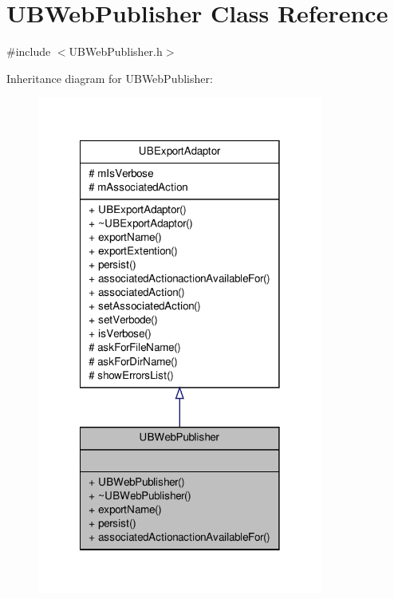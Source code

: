 \hypertarget{class_u_b_web_publisher}{\section{U\-B\-Web\-Publisher Class Reference}
\label{de/d5f/class_u_b_web_publisher}
}


{\ttfamily \#include $<$U\-B\-Web\-Publisher.\-h$>$}



Inheritance diagram for U\-B\-Web\-Publisher\-:
\nopagebreak
\begin{figure}[H]
\begin{center}
\leavevmode
\includegraphics[width=266pt]{db/d49/class_u_b_web_publisher__inherit__graph}
\end{center}
\end{figure}


